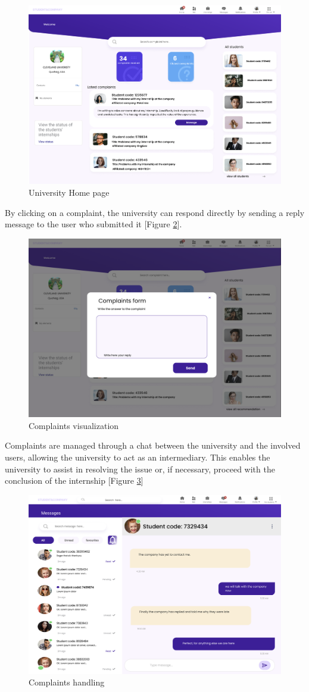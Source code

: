 \begin{figure} [H]
    \centering
    \includegraphics[width=0.5\linewidth]{Interface Images/university interface/Screenshot 2024-12-12 045335.png}
    \caption{University Home page}
    \label{fig: University Home page}
\end{figure}


By clicking on a complaint, the university can respond directly by sending a reply message to the user who submitted it [Figure \ref{fig:Complaints visualization}].

\begin{figure} [H]
    \centering
    \includegraphics[width=0.5\linewidth]{Interface Images/university interface/Screenshot 2024-12-12 050002.png}
    \caption{Complaints visualization}
    \label{fig:Complaints visualization}
\end{figure}


Complaints are managed through a chat between the university and the involved users, allowing the university to act as an intermediary. This enables the university to assist in resolving the issue or, if necessary, proceed with the conclusion of the internship [Figure \ref{fig: Complaints handling}]

\begin{figure} [H]
    \centering
    \includegraphics[width=0.5\linewidth]{Interface Images/university interface/Screenshot 2024-12-12 050017.png}
    \caption{Complaints handling}
    \label{fig: Complaints handling}
\end{figure}

